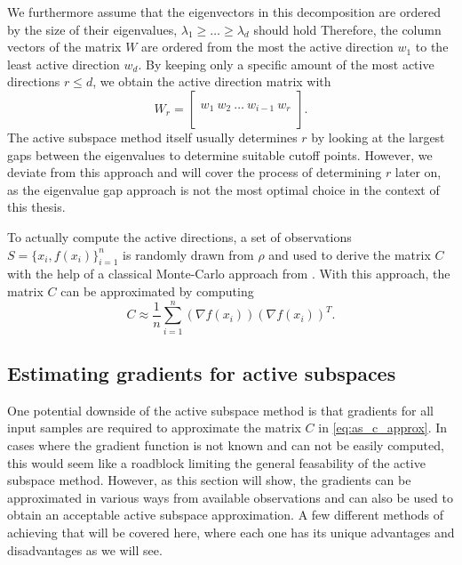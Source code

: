 \documentclass[
  a4paper,  %
  twoside,  %
  bibliography=totoc,
  headsepline,
  cleardoublepage=empty,
  parskip=half,
  draft=false
]{scrbook}
\begin{document}
We furthermore assume that the eigenvectors in this decomposition are ordered by the size of their eigenvalues, \ie $\lambda_1 \geq \dots \geq \lambda_d$ should hold
Therefore, the column vectors of the matrix $W$ are ordered from the most the active direction $w_1$ to the least active direction $w_d$.
By keeping only a specific amount of the most active directions $r \leq d$, we obtain the active direction matrix with
\begin{equation}
W_r=\begin{bmatrix}
  \\
    w_1 ~ w_2 ~ \dots ~ w_{i-1} ~ w_r\\
    \\
  \end{bmatrix}.
\label{basis}
\end{equation}
%
The active subspace method itself usually determines $r$ by looking at the largest gaps between the eigenvalues to determine suitable cutoff points.
However, we deviate from this approach and will cover the process of determining $r$ later on, as the eigenvalue gap approach is not the most optimal choice in the context of this thesis.

To actually compute the active directions, a set of observations $S = \{x_i, f(x_i)\}_{i=1}^n$ is randomly drawn from $\rho$ and used to derive the matrix $C$ with the help of a classical Monte-Carlo approach from \cite{Constantine2014}.
With this approach, the matrix $C$ can be approximated by computing
\begin{equation}
C \approx \frac{1}{n} \sum_{i=1}^n  \left(\nabla f(x_i)\right) \left(\nabla f(x_i)\right)^T.
\label{eq:as_c_approx}
\end{equation}

\subsection{Estimating gradients for active subspaces}
\label{sec:as_est}

One potential downside of the active subspace method is that gradients for all input samples are required to approximate the matrix $C$ in \cref{eq:as_c_approx}.
In cases where the gradient function is not known and can not be easily computed, this would seem like a roadblock limiting the general feasability of the active subspace method.
However, as this section will show, the gradients can be approximated in various ways from available observations and can also be used to obtain an acceptable active subspace approximation.
A few different methods of achieving that will be covered here, where each one has its unique advantages and disadvantages as we will see.
\end{document}

